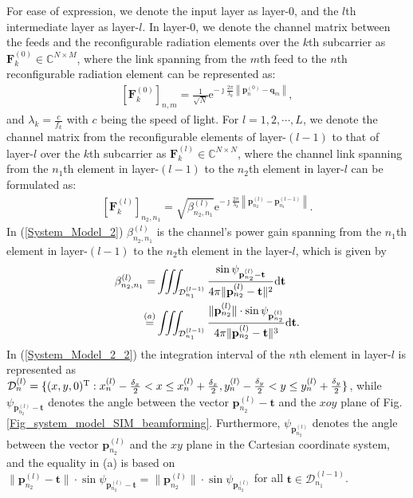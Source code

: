 \documentclass[lettersize,journal]{IEEEtran}
\theoremstyle{remark}
\begin{document}
For ease of expression, we denote the input layer as layer-0, and the $l$th intermediate layer as layer-$l$. In layer-0, we denote the channel matrix between the feeds and the reconfigurable radiation elements over the $k$th subcarrier as $\mathbf{F}_k^{(0)}\in\mathbb{C}^{N\times M}$, where the link spanning from the $m$th feed to the $n$th reconfigurable radiation element can be represented as:
\begin{align}\label{System_Model_1}
    \left[\mathbf{F}_k^{(0)}\right]_{n,m}=\frac{1}{\sqrt{N}}\mathrm{e}^{-\jmath \frac{2\pi}{\lambda_k}
    \left\|\mathbf{p}_{n}^{(0)}-\mathbf{q}_{m}\right\|},
\end{align}
and $\lambda_k=\frac{c}{f_k}$ with $c$ being the speed of light. For $l=1,2,\cdots,L$, we denote the channel matrix from the reconfigurable elements of layer-$(l-1)$ to that of layer-$l$ over the $k$th subcarrier as $\mathbf{F}_k^{(l)}\in\mathbb{C}^{N\times N}$, where the channel link spanning from the $n_1$th element in layer-$(l-1)$ to the $n_2$th element in layer-$l$ can be formulated as:
\begin{align}\label{System_Model_2}
    \left[\mathbf{F}_k^{(l)}\right]_{n_2,n_1}=\sqrt{\beta_{n_2,n_1}^{(l)}}\mathrm{e}^{-\jmath \frac{2\pi}{\lambda_k}
    \left\|\mathbf{p}_{n_2}^{(l)}-\mathbf{p}_{n_1}^{(l-1)}\right\|}.
\end{align}
In (\ref{System_Model_2}) $\beta_{n_2,n_1}^{(l)}$ is the channel's power gain spanning from the $n_1$th element in layer-$(l-1)$ to the $n_2$th element in the layer-$l$, which is given by
\begin{align}\label{System_Model_2_2}
    \notag\beta_{n_2,n_1}^{(l)}
    =&\iiint_{\mathcal{D}_{n_1}^{(l-1)}}\frac{\sin\psi_{\mathbf{p}_{n_2}^{(l)}
    -\mathbf{t}}}{4\pi\|\mathbf{p}_{n_2}^{(l)}-\mathbf{t}\|^2}\mathrm{d}\mathbf{t}\\
    \overset{(a)}=&\iiint_{\mathcal{D}_{n_1}^{(l-1)}}\frac{\|\mathbf{p}_{n_2}^{(l)}\|\cdot
    \sin\psi_{\mathbf{p}_{n_2}^{(l)}}}{4\pi\|\mathbf{p}_{n_2}^{(l)}-\mathbf{t}\|^3}
    \mathrm{d}\mathbf{t}.
\end{align}
In (\ref{System_Model_2_2}) the integration interval of the $n$th element in layer-$l$ is represented as $\notag{\mathcal{D}_{n}^{(l)}}
=\{(x,y,0)^\mathrm{T}:x_{n}^{(l)}-\frac{\delta_x}{2}<x\leq x_{n}^{(l)}+\frac{\delta_x}{2},y_{n}^{(l)}-\frac{\delta_y}{2}<y\leq y_{n}^{(l)}+\frac{\delta_y}{2}\}$, while $\psi_{\mathbf{p}_{n_2}^{(l)}-\mathbf{t}}$ denotes the angle between the vector $\mathbf{p}_{n_2}^{(l)}-\mathbf{t}$ and the $xoy$ plane of Fig. \ref{Fig_system_model_SIM_beamforming}. Furthermore, $\psi_{\mathbf{p}_{n_2}^{(l)}}$ denotes the angle between the vector $\mathbf{p}_{n_2}^{(l)}$ and the $xy$ plane in the Cartesian coordinate system, and the equality in (a) is based on $\|\mathbf{p}_{n_2}^{(l)}-\mathbf{t}\|\cdot\sin\psi_{\mathbf{p}_{n_2}^{(l)}-\mathbf{t}}
=\|\mathbf{p}_{n_2}^{(l)}\|\cdot\sin\psi_{\mathbf{p}_{n_2}^{(l)}}$ for all $\mathbf{t}\in{\mathcal{D}_{n_1}^{(l-1)}}$.
\end{document}
